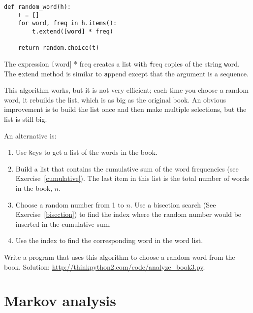 \documentclass[
DIV=11,
fontsize=13,
twoside,
headinclude=false,
titlepage=firstiscover,
abstract=true,
headsepline=true,
footsepline=true,
chapterprefix=true, %
headings=big,
bibliography=totoc,%
captions=tableheading
]{scrbook}
\theoremstyle{definition}
\begin{document}
\begin{lstlisting}
def random_word(h):
    t = []
    for word, freq in h.items():
        t.extend([word] * freq)

    return random.choice(t)
\end{lstlisting}
%
The expression {\texttt [word] * freq} creates a list with {\texttt freq}
copies of the string {\texttt word}.  The {\texttt extend}
method is similar to {\texttt append} except that the argument is
a sequence.

This algorithm works, but it is not very efficient; each time you
choose a random word, it rebuilds the list, which is as big as
the original book.  An obvious improvement is to build the list
once and then make multiple selections, but the list is still big.

An alternative is:

\begin{enumerate}

\item Use {\texttt keys} to get a list of the words in the book.

\item Build a list that contains the cumulative sum of the word
  frequencies (see Exercise~\ref{cumulative}).  The last item
  in this list is the total number of words in the book, $n$.
  
\item Choose a random number from 1 to $n$.  Use a bisection search
  (See Exercise~\ref{bisection}) to find the index where the random
  number would be inserted in the cumulative sum.

\item Use the index to find the corresponding word in the word list.

\end{enumerate}

\begin{exercise}
\normalfont
\label{randhist}

Write a program that uses this algorithm to choose a random word from
the book.  Solution:
\url{http://thinkpython2.com/code/analyze_book3.py}.

\end{exercise}



\section{Markov analysis}
\label{markov}
\end{document}
